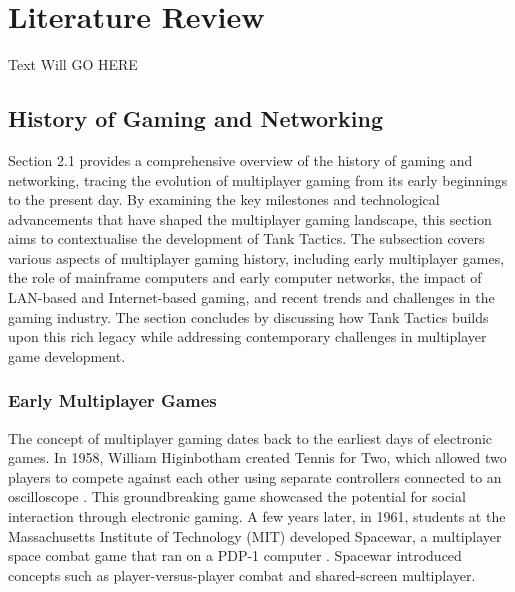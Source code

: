 \chapter{Literature Review}
\label{ch:lit_rev} %

Text Will GO HERE

\section{History of Gaming and Networking}
Section 2.1 provides a comprehensive overview of the history of gaming and networking, tracing the evolution of multiplayer gaming from its early beginnings to the present day. By examining the key milestones and technological advancements that have shaped the multiplayer gaming landscape, this section aims to contextualise the development of Tank Tactics. The subsection covers various aspects of multiplayer gaming history, including early multiplayer games, the role of mainframe computers and early computer networks, the impact of LAN-based and Internet-based gaming, and recent trends and challenges in the gaming industry. The section concludes by discussing how Tank Tactics builds upon this rich legacy while addressing contemporary challenges in multiplayer game development.

\subsection{Early Multiplayer Games}
The concept of multiplayer gaming dates back to the earliest days of electronic games. In 1958, William Higinbotham created Tennis for Two, which allowed two players to compete against each other using separate controllers connected to an oscilloscope \cite{arm2006networking}. This groundbreaking game showcased the potential for social interaction through electronic gaming. A few years later, in 1961, students at the Massachusetts Institute of Technology (MIT) developed Spacewar, a multiplayer space combat game that ran on a PDP-1 computer \cite{arm2006networking}. Spacewar introduced concepts such as player-versus-player combat and shared-screen multiplayer.

